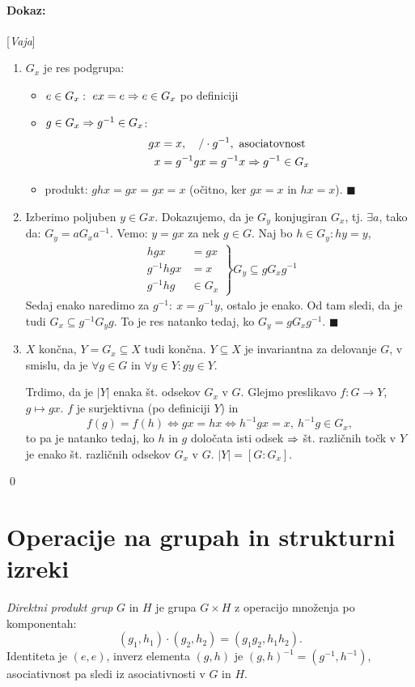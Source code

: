 \paragraph{Dokaz:}[\emph{Vaja}]
\begin{enumerate}
	\item{$G_x$ je res podgrupa:
		\begin{itemize}
			\item{$e \in G_x:\ ex = e \Rightarrow e \in G_x$ po definiciji}
			\item{$g \in G_x \Rightarrow g^{-1} \in G_x$:
				\begin{align*}
					gx &= x,\quad /\cdot g^{-1},\ \text{asociatovnost} \\
					x &= g^{-1}g x = g^{-1} x \then g^{-1} \in G_x \\
				\end{align*}}
			\item{produkt: $ghx = gx = gx = x$ (o\v citno, ker $gx = x$ in $hx = x$). $\blacksquare$}
		\end{itemize}}
	\item{Izberimo poljuben $y \in Gx$. Dokazujemo, da je $G_y$ konjugiran $G_x$, tj. $\exists a$, tako da: $G_y = a G_x a^{-1}$.
		Vemo: $y = gx$ za nek $g \in G$. Naj bo $h \in G_y: hy = y$,
		\begin{align*}
			\left.
			\begin{array}{rl}
			hgx &= gx\\
			g^{-1} hgx &= x\\
			g^{-1} h g &\in G_x
			\end{array} \right\} G_y \subseteq g G_x g^{-1}
		\end{align*}}
		Sedaj enako naredimo za $g^{-1}:\ x = g^{-1} y$, ostalo je enako. Od tam sledi, da je tudi $G_x \subseteq g^{-1} G_y g$.
		To je res natanko tedaj, ko $G_y = gG_x g^{-1}$. $\blacksquare$
	\item{$X$ kon\v cna, $Y = G_x \subseteq X$ tudi kon\v cna. $Y \subseteq X$ je invariantna za delovanje $G$, v smislu, da je
		$\forall g \in G$ in $\forall y \in Y: gy \in Y$.

		\ni Trdimo, da je $|Y|$ enaka \v st. odsekov $G_x$ v $G$. Glejmo preslikavo $f : G \to Y$, $g \mapsto gx$. $f$ je surjektivna  (po definiciji $Y$) in
		\[
			f(g) = f(h) \iff gx = hx \iff h^{-1}gx = x,\ h^{-1}g \in G_x,
		\] to pa je natanko tedaj, ko $h$ in $g$ dolo\v cata isti odsek $\Rightarrow$ \v st. razli\v cnih to\v ck v $Y$ je enako \v st. razli\v cnih odsekov $G_x$
		v $G$. $|Y| = [G:G_x]$.}
\end{enumerate}
\qed

\section{Operacije na grupah in strukturni izreki}

\begin{defin}
	\emph{Direktni produkt grup} $G$ in $H$ je grupa $G \times H$ z operacijo mno\v zenja po komponentah:
	\[
		(g_1, h_1) \cdot (g_2, h_2) = (g_1 g_2, h_1 h_2).
	\]
	Identiteta je $(e, e)$, inverz elementa $(g, h)$ je $(g, h)^{-1} = (g^{-1}, h^{-1})$, asociativnost pa
	sledi iz asociativnosti v $G$ in $H$.
\end{defin}

